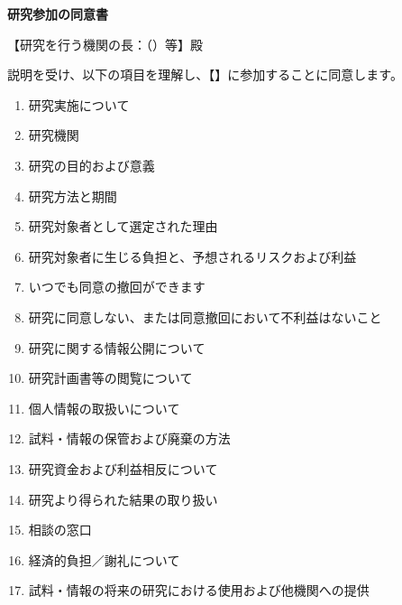 \documentclass[a4paper,11pt,lualatex,ja=standard]{bxjsarticle}
\begin{document}
\begin{center}
{\LARGE \textbf{研究参加の同意書}}

\vspace{0.5em}

{\small \ProtocolVersion\hspace{1em}\ProtocolDate}
\end{center}

\vspace{1em}

\noindent
【研究を行う機関の長：（\InstitutionHead）等】殿

\vspace{0.5em}

\noindent
説明を受け、以下の項目を理解し、【\ResearchTitle】に参加することに同意します。

\vspace{0.5em}

\begin{enumerate}
\setlength{\itemsep}{0.1em}
\setlength{\parsep}{0pt}
\item 研究実施について
\item 研究機関
\item 研究の目的および意義
\item 研究方法と期間
\item 研究対象者として選定された理由
\item 研究対象者に生じる負担と、予想されるリスクおよび利益
\item いつでも同意の撤回ができます
\item 研究に同意しない、または同意撤回において不利益はないこと
\item 研究に関する情報公開について
\item 研究計画書等の閲覧について
\item 個人情報の取扱いについて
\item 試料・情報の保管および廃棄の方法
\item 研究資金および利益相反について
\item 研究より得られた結果の取り扱い
\item 相談の窓口
\item 経済的負担／謝礼について
\item 試料・情報の将来の研究における使用および他機関への提供
\end{enumerate}
\end{document}

